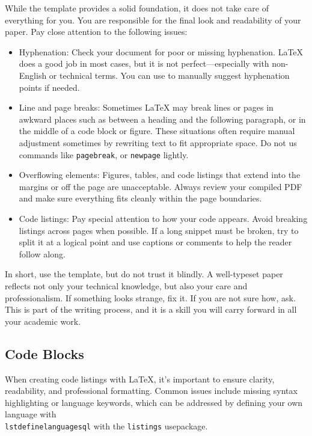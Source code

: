 \documentclass[sigconf,nonacm,screen]{acmart}
\begin{document}
While the template provides a solid foundation, it does not take care of everything for you. You are responsible for the final look and readability of your paper. Pay close attention to the following issues:

\begin{itemize}
    
    \item Hyphenation: Check your document for poor or missing hyphenation. LaTeX does a good job in most cases, but it is not perfect---especially with non-English or technical terms. You can use \- to manually suggest hyphenation points if needed.
    
    \item Line and page breaks: Sometimes LaTeX may break lines or pages in awkward places such as between a heading and the following paragraph, or in the middle of a code block or figure. These situations often require manual adjustment sometimes by rewriting text to fit appropriate space. Do not us commands like \texttt{pagebreak}, or \texttt{newpage} lightly.

    \item Overflowing elements: Figures, tables, and code listings that extend into the margins or off the page are unacceptable. Always review your compiled PDF and make sure everything fits cleanly within the page boundaries.

    \item Code listings: Pay special attention to how your code appears. Avoid breaking listings across pages when possible. If a long snippet must be broken, try to split it at a logical point and use captions or comments to help the reader follow along.
    
\end{itemize}

In short, use the template, but do not trust it blindly. A well-typeset paper reflects not only your technical knowledge, but also your care and professionalism. If something looks strange, fix it. If you are not sure how, ask. This is part of the writing process, and it is a skill you will carry forward in all your academic work.

\subsection{Code Blocks}

When creating code listings with LaTeX, it's important to ensure clarity, readability, and professional formatting. Common issues include missing syntax highlighting or language keywords, which can be addressed by defining your own language with \texttt{\\lstdefinelanguage{sql}} with the \texttt{listings} usepackage. 
\end{document}
